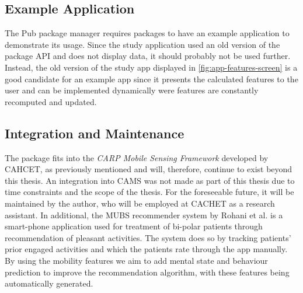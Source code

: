 \subsection{Example Application}
The Pub package manager requires packages to have an example application to demonstrate its usage. Since the study application used an old version of the package API and does not display data, it should probably not be used further. Instead, the old version of the study app displayed in \ref{fig:app-features-screen} is a good candidate for an example app since it presents the calculated features to the user and can be implemented dynamically were features are constantly recomputed and updated.

\subsection{Integration and Maintenance}
The package fits into the \textit{CARP Mobile Sensing Framework} developed by CAHCET, as previously mentioned and will, therefore, continue to exist beyond this thesis. An integration into CAMS was not made as part of this thesis due to time constraints and the scope of the thesis. For the foreseeable future, it will be maintained by the author, who will be employed at CACHET as a research assistant. In additional, the MUBS recommender system by Rohani et al. \cite{mubs-rohani} is a smart-phone application used for treatment of bi-polar patients through recommendation of pleasant activities. The system does so by tracking patients' prior engaged activities and which the patients rate through the app manually. By using the mobility features we aim to add mental state and behaviour prediction to improve the recommendation algorithm, with these features being automatically generated.